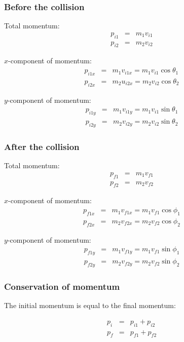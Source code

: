 \subsubsection*{Before the collision}
Total momentum:
\begin{eqnarray*}
p_{i1} &=& m_1 v_{i1}\\
p_{i2} &=& m_2 v_{i2}
\end{eqnarray*}

$x$-component of momentum:
\begin{eqnarray*}
p_{i1x} &=& m_1 v_{i1x} =m_1 v_{i1} \cos \theta_1\\
p_{i2x} &=& m_2 u_{i2x} = m_2 v_{i2} \cos \theta_2
\end{eqnarray*}

$y$-component of momentum:
\begin{eqnarray*}
p_{i1y} &=& m_1 v_{i1y} =m_1 v_{i1} \sin \theta_1\\
p_{i2y} &=& m_2 v_{i2y} = m_2 v_{i2} \sin \theta_2
\end{eqnarray*}

\subsubsection*{After the collision}
Total momentum:
\begin{eqnarray*}
p_{f1} &=& m_1 v_{f1}\\
p_{f2} &=& m_2 v_{f2}
\end{eqnarray*}

$x$-component of momentum:
\begin{eqnarray*}
p_{f1x} &=& m_1 v_{f1x} =m_1 v_{f1} \cos \phi_1\\
p_{f2x} &=& m_2 v_{f2x} = m_2 v_{f2} \cos \phi_2
\end{eqnarray*}

$y$-component of momentum:
\begin{eqnarray*}
p_{f1y} &=& m_1 v_{f1y} =m_1 v_{f1} \sin \phi_1\\
p_{f2y} &=& m_2 v_{f2y} = m_2 v_{f2} \sin \phi_2
\end{eqnarray*}

\subsubsection*{Conservation of momentum}

The initial momentum is equal to the final momentum:

\begin{eqnarray*}
p_{i} &=& p_{i1}+p_{i2}\\
p_{f} &=& p_{f1}+p_{f2}
\end{eqnarray*}

